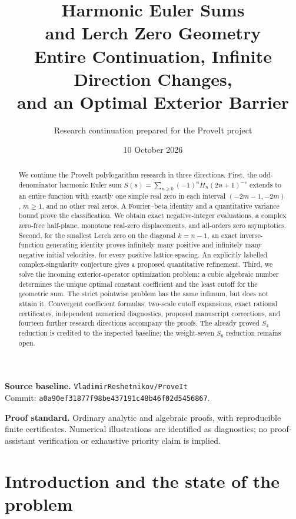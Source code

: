\documentclass[11pt,a4paper]{article}
\title{\vspace{-1.5em}\color{navy}\textbf{Harmonic Euler Sums\\and Lerch Zero Geometry}\\[.65em]
\large Entire Continuation, Infinite Direction Changes,\\
and an Optimal Exterior Barrier}
\author{Research continuation prepared for the ProveIt project}
\date{10 October 2026}
\theoremstyle{definition}
\theoremstyle{remark}
\numberwithin{equation}{section}
\begin{document}
\maketitle
\thispagestyle{empty}
\begin{abstract}
We continue the ProveIt polylogarithm research in three directions.
First, the odd-denominator harmonic Euler sum
$S(s)=\sum_{n\ge0}(-1)^nH_n(2n+1)^{-s}$ extends to an entire
function with exactly one simple real zero in each interval
$(-2m-1,-2m)$, $m\ge1$, and no other real zeros. A Fourier--beta
identity and a quantitative variance bound prove the classification.
We obtain exact negative-integer evaluations, a complex zero-free
half-plane, monotone real-zero displacements, and all-orders zero
asymptotics.
Second, for the smallest Lerch zero on the diagonal $k=n-1$,
an exact inverse-function generating identity proves infinitely many
positive and infinitely many negative initial velocities, for every
positive lattice spacing. An explicitly labelled complex-singularity
conjecture gives a proposed quantitative refinement.
Third, we solve the incoming exterior-operator optimization problem:
a cubic algebraic number determines the unique optimal constant
coefficient and the least cutoff for the geometric sum. The strict
pointwise problem has the same infimum, but does not attain it.
Convergent coefficient formulas, two-scale cutoff expansions, exact
rational certificates, independent numerical diagnostics, proposed
manuscript corrections, and fourteen further research directions
accompany the proofs.
The already proved $S_4$ reduction is credited to the inspected
baseline; the weight-seven $S_6$ reduction remains open.
\end{abstract}

\vfill
\noindent\textbf{Source baseline.}\quad
\texttt{VladimirReshetnikov/ProveIt}\\
Commit:
\texttt{a0a90ef31877f98be437191c48b46f02d5456867}.

\medskip
\noindent\textbf{Proof standard.}\quad
Ordinary analytic and algebraic proofs, with reproducible finite
certificates. Numerical illustrations are identified as diagnostics;
no proof-assistant verification or exhaustive priority claim is implied.
\clearpage
\begingroup
\small
\tableofcontents
\endgroup
\clearpage
\section{Introduction and the state of the problem}
\label{sec:introduction}
\end{document}
